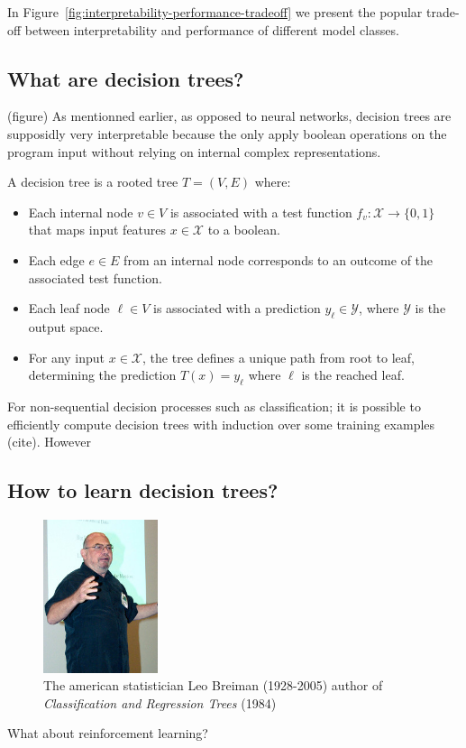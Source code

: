 In Figure~\ref{fig:interpretability-performance-tradeoff} we present the popular trade-off between interpretability and performance of different model classes.
\subsection{What are decision trees?}
(figure)
As mentionned earlier, as opposed to neural networks, decision trees are supposidly very interpretable because the only apply boolean operations on the program input without relying on internal complex representations.
\begin{definition}
A decision tree is a rooted tree $T = (V, E)$ where:
\begin{itemize}
\item Each internal node $v \in V$ is associated with a test function $f_v: \mathcal{X} \rightarrow \{0, 1\}$ that maps input features $x \in \mathcal{X}$ to a boolean.
\item Each edge $e \in E$ from an internal node corresponds to an outcome of the associated test function.
\item Each leaf node $\ell \in V$ is associated with a prediction $y_\ell \in \mathcal{Y}$, where $\mathcal{Y}$ is the output space.
\item For any input $x \in \mathcal{X}$, the tree defines a unique path from root to leaf, determining the prediction $T(x) = y_\ell$ where $\ell$ is the reached leaf.
\end{itemize}
\end{definition}
For non-sequential decision processes such as classification; it is possible to efficiently compute decision trees with induction over some training examples (cite). However 
\subsection{How to learn decision trees?}
\begin{figure}
    \centering
    \includegraphics[width=0.3\textwidth]{images/images_intro/Leo_Breiman.jpg}
    \caption{The american statistician Leo Breiman (1928-2005) author of \textit{Classification and Regression Trees} (1984)}
\end{figure}
What about reinforcement learning?

